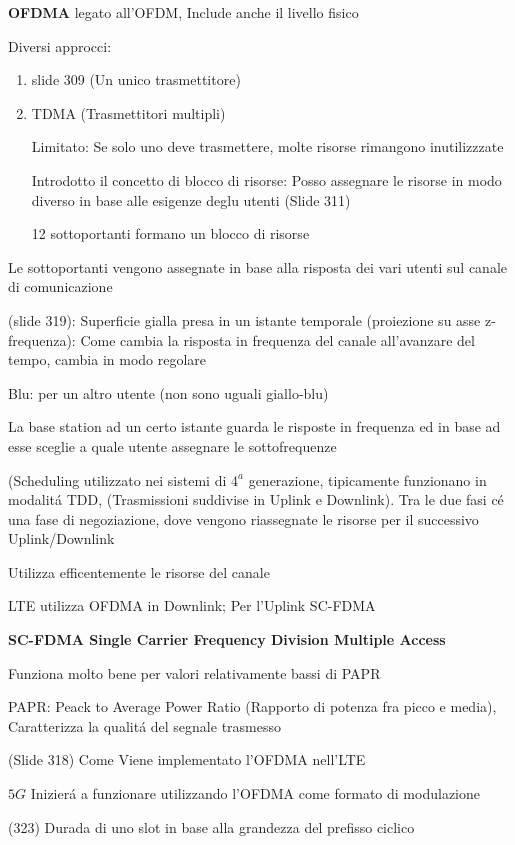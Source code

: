 \documentclass{article}
\begin{document}
\textbf{OFDMA} legato all'OFDM, Include anche il livello fisico

Diversi approcci:
\begin{enumerate}
    \item slide 309 (Un unico trasmettitore)
    \item TDMA (Trasmettitori multipli)

        Limitato:
        Se solo uno deve trasmettere, molte risorse rimangono inutilizzzate

        Introdotto il concetto di blocco di risorse:
        Posso assegnare le risorse in modo diverso in base alle esigenze deglu utenti (Slide 311)

        12 sottoportanti formano un blocco di risorse

\end{enumerate}
Le sottoportanti vengono assegnate in base alla risposta dei vari utenti sul canale di comunicazione

(slide 319):
Superficie gialla presa in un istante temporale (proiezione su asse z-frequenza): Come cambia la risposta in frequenza del canale all'avanzare del tempo, cambia in modo regolare

Blu: per un altro utente (non sono uguali giallo-blu)

La base station ad un certo istante guarda le risposte in frequenza ed in base ad esse sceglie a quale utente assegnare le sottofrequenze

(Scheduling utilizzato nei sistemi di $4^a$ generazione, tipicamente funzionano in modalit\'a TDD, (Trasmissioni suddivise in Uplink e Downlink). Tra le due fasi c\'e una fase di negoziazione, dove vengono riassegnate le risorse per il successivo Uplink/Downlink

Utilizza efficentemente le risorse del canale

LTE utilizza OFDMA in Downlink; Per l'Uplink SC-FDMA

\textbf{SC-FDMA Single Carrier Frequency Division Multiple Access}

Funziona molto bene per valori relativamente bassi di PAPR

PAPR: Peack to Average Power Ratio (Rapporto di potenza fra picco e media), Caratterizza la qualit\'a del segnale trasmesso

(Slide 318) Come Viene implementato l'OFDMA nell'LTE

$5G$ Inizier\'a a funzionare utilizzando l'OFDMA come formato di modulazione

(323) Durada di uno slot in base alla grandezza del prefisso ciclico
\end{document}
